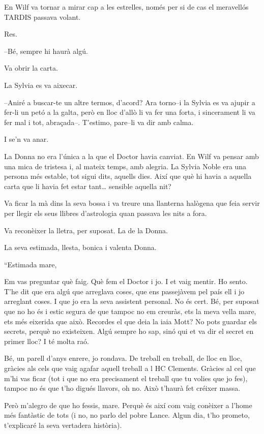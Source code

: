 En Wilf va tornar a mirar cap a les estrelles, només per si de cas el
meravellós TARDIS passava volant.

Res.

--Bé, sempre hi haurà algú.

Va obrir la carta.

La Sylvia es va aixecar.

--Aniré a buscar-te un altre termos, d'acord? Ara torno--i la Sylvia es
va ajupir a fer-li un petó a la galta, però en lloc d'allò li va fer una
forta, i sincerament li va fer mal i tot, abraçada--. T'estimo, pare--li
va dir amb calma.

I se'n va anar.

La Donna no era l'única a la que el Doctor havia canviat. En Wilf va
pensar amb una mica de tristesa i, al mateix temps, amb alegria. La
Sylvia Noble era una persona més estable, tot sigui dits, aquells dies.
Així que què hi havia a aquella carta que li havia fet estar
tant\ldots{} sensible aquella nit?

Va ficar la mà dins la seva bossa i va treure una llanterna halògena que
feia servir per llegir els seus llibres d'astrologia quan passava les
nits a fora.

Va reconèixer la lletra, per suposat. La de la Donna.

La seva estimada, llesta, bonica i valenta Donna.

``Estimada mare,

Em vas preguntar què faig. Què fem el Doctor i jo. I et vaig mentir. Ho
sento. T'he dit que era algú que arreglava coses, que ens passejàvem pel
país ell i jo arreglant coses. I que jo era la seva assistent personal.
No és cert. Bé, per suposat que no ho és i estic segura de que tampoc no
em creuràs, ets la meva vella mare, ets més eixerida que això. Recordes
el que deia la iaia Mott? No pots guardar els secrets, perquè no
existeixen. Algú sempre ho sap, sinó qui et va dir el secret en primer
lloc? I té molta raó.

Bé, un parell d'anys enrere, jo rondava. De treball en treball, de lloc
en lloc, gràcies als cels que vaig agafar aquell treball a l HC
Clements. Gràcies al cel que m'hi vas ficar (tot i que no era
precisament el treball que tu volies que jo fes), tampoc no és que t'ho
digués llavors, oh no. Això t'haurà fet créixer massa.

Però m'alegro de que ho fessis, mare. Perquè és així com vaig conèixer a
l'home més fantàstic de tots (i no, no parlo del pobre Lance. Algun dia,
t'ho prometo, t'explicaré la seva vertadera història).


